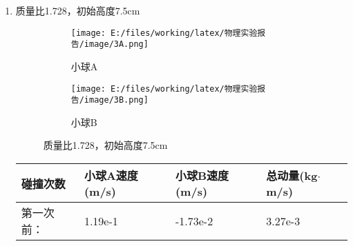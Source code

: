 \documentclass[UTF8]{article}
\begin{document}
\begin{enumerate}
\begin{enumerate}[left=2em, label=\arabic*)]
\begin{table}[H]
\begin{tabularx}{\textwidth}
                                \end{tabularx}
                                \caption{质量比3.835，初始高度6cm}
                                \label{form:3.835-6}
                            \end{table}
                        \item 质量比1.728，初始高度7.5cm
                            \begin{figure}[H]
                                \centering
                                \begin{subfigure}{0.45\textwidth}
                                    \centering
                                    \texttt{[image: E:/files/working/latex/物理实验报告/image/3A.png]}
                                    \caption{小球A}
                                    \label{fig:3A}
                                \end{subfigure}
                                \hfill
                                \begin{subfigure}{0.45\textwidth}
                                    \centering
                                    \texttt{[image: E:/files/working/latex/物理实验报告/image/3B.png]}
                                    \caption{小球B}
                                    \label{fig:3B}
                                \end{subfigure}
                                \caption{质量比1.728，初始高度7.5cm}
                                \label{fig:1.728-7.5}
                            \end{figure}
                            \vfill
                            \begin{table}[H]
                                \centering
                                \begin{tabularx}{\textwidth}{
                                    || >{\centering\arraybackslash}X
                                    | >{\centering\arraybackslash}X
                                    | >{\centering\arraybackslash}X
                                    | >{\centering\arraybackslash}X
                                    ||
                                }
                                    \hline
                                    碰撞次数 & 小球A速度(m/s) & 小球B速度(m/s) & 总动量(kg$\cdot$m/s)\\ \hline
                                    第一次前： & 1.19e-1 & -1.73e-2 & 3.27e-3 \\ \hline

\end{tabularx}
\end{table}
\end{enumerate}
\end{enumerate}
\end{document}
